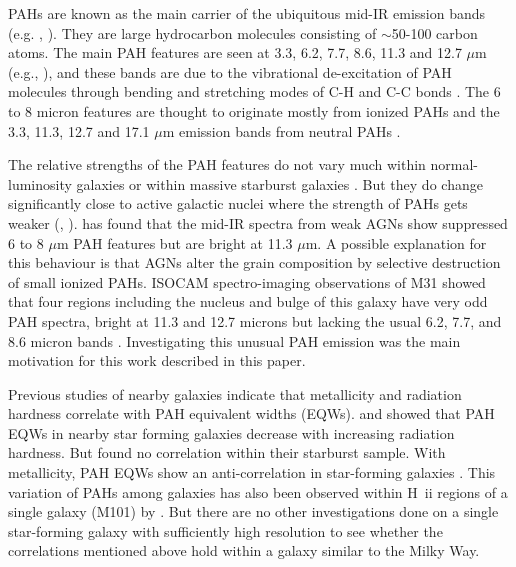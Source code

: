 \documentclass[useAMS,usenatbib,a4paper]{mn2e}
\begin{document}
PAHs are known as the main carrier of the ubiquitous mid-IR emission bands (e.g. \citealt{Allamandola1989}, \citealt{Tielens2008}). They are large hydrocarbon molecules consisting of $\sim$50-100 carbon atoms. The main PAH features are seen at 3.3, 6.2, 7.7, 8.6, 11.3 and 12.7 $\mu $m (e.g.\citealt{Mattila1996}, \citealt{Peeters2002}), and these bands are due to the vibrational de-excitation of PAH molecules  through bending and stretching modes of C-H and C-C bonds \citep{Tielens:2005lr}. The 6 to 8 micron features are thought to originate mostly from ionized PAHs and the 3.3, 11.3, 12.7 and 17.1 $\mu$m emission bands from neutral PAHs \citep{Peeters2002}. 


The relative strengths of the PAH features do not vary much within normal-luminosity galaxies \citep{Smith:2007lr} or within massive starburst galaxies \citep{Brandl2006}. But they do change significantly close to active galactic nuclei where the strength of PAHs gets weaker (\citealt{Roche1991}, \citealt{Smith:2007lr}). \citet{Smith:2007lr} has found that the mid-IR spectra from weak AGNs show suppressed 6 to 8 $\mu$m PAH features but are bright at 11.3 $\mu$m. A possible explanation for this behaviour is that AGNs alter the grain composition by selective destruction of small ionized PAHs. ISOCAM spectro-imaging observations of M31\citep{1998Cesarsky} showed that four regions including the nucleus and bulge of this galaxy have very odd PAH spectra, bright at 11.3 and 12.7 microns but lacking the usual 6.2, 7.7, and 8.6 micron bands . Investigating this unusual PAH emission was the main motivation for this work described in this paper. 


Previous studies of nearby galaxies indicate that metallicity and radiation hardness correlate with PAH equivalent widths (EQWs). \citet{Smith:2007lr} and \citet{Engelbracht_2008} showed that PAH EQWs in nearby star forming galaxies  decrease with increasing radiation hardness. But  \citet{Brandl2006} found no correlation within their starburst sample.  With metallicity, PAH EQWs show an anti-correlation in star-forming galaxies \citep{Marble_2010}. This variation of PAHs among galaxies has also been observed within H~{\sc ii} regions of a single galaxy (M101) by \citet{Gordon:2008lr}. But there are no other investigations done on a single star-forming galaxy with sufficiently high resolution to see whether the correlations mentioned above hold within a galaxy similar to the Milky Way.
\end{document}
